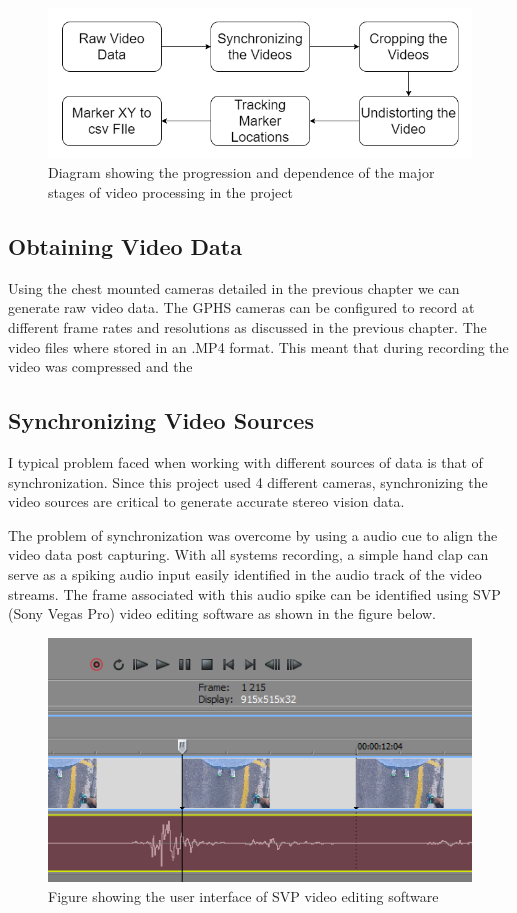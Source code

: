 \begin{figure}[!ht]
  \includegraphics[width=\linewidth]{figures/videoProcess.png}
  \caption{Diagram showing the progression and dependence of the major stages of video processing in the project}
  \label{fig:videoProcess}
\end{figure}

\subsection{Obtaining Video Data}
Using the chest mounted cameras detailed in the previous chapter we can generate raw video data. The GPHS cameras can be configured to record at different frame rates and resolutions as discussed in the previous chapter. The video files where stored in an .MP4 format. This meant that during recording the video was compressed and the 


\subsection{Synchronizing Video Sources}
I typical problem faced when working with different sources of data is that of synchronization. Since this project used 4 different cameras, synchronizing the video sources are critical to generate accurate stereo vision data.

The problem of synchronization was overcome by using a audio cue to align the video data post capturing. With all systems recording, a simple hand clap can serve as a spiking audio input easily identified in the audio track of the video streams. The frame associated with this audio spike can be identified using SVP (Sony Vegas Pro) video editing software as shown in the figure below. 

\begin{figure}[!ht]
\centering
  \includegraphics[width=0.5\linewidth]{figures/svpframe.png}
  \caption{Figure showing the user interface of SVP video editing software}
  \label{fig:svpframe}
\end{figure}

